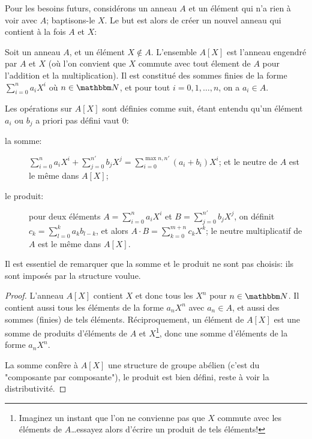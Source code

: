   Pour les besoins futurs, considérons un anneau \( A \) et un élément qui n'a rien à voir avec \( A \); baptisons-le \( X \). Le but est alors de créer un nouvel anneau qui contient à la fois \( A \) et \( X \):

\begin{propositionDef}   \label{DefAnneauPolyAX}
  Soit un anneau \( A \), et un élément \( X \notin A \). L'ensemble \( A[X] \) est l'anneau engendré par \( A \) et \( X \) (où l'on convient que \( X \) commute avec tout élement de \(A \) pour l'addition et la multiplication). Il est constitué des sommes finies de la forme \( \sum_{i = 0}^n a_i X^i \) où \( n \in \eN \), et pour tout \( i = 0, 1, \dots, n \), on a \( a_i \in A \).
  
  Les opérations sur \( A[X] \) sont définies comme suit, étant entendu qu'un élément \(a_i\) ou \(b_j\) a priori pas défini vaut 0:
  \begin{description}
    \item[la somme:] \( \sum_{i = 0}^n a_i X^i + \sum_{j = 0}^{n'} b_j X^j =  \sum_{i = 0}^{\max{n, n'}} (a_i + b_i) X^i \); et le neutre de \( A \) est le même dans \( A[X] \);
    \item[le produit:] pour deux éléments \( A = \sum_{i = 0}^n a_i X^i \) et \(B = \sum_{j = 0}^{n'} b_j X^j \), on définit \( c_k = \sum_{l = 0}^k a_k b_{l-k} \), et alors \( A \cdot B = \sum_{k = 0}^{m+n} c_k X^k \); le neutre multiplicatif de \( A \) est le même dans \( A[X] \).
  \end{description}
\end{propositionDef}

Il est essentiel de remarquer que la somme et le produit ne sont pas choisis: ils sont imposés par la structure voulue.

\begin{proof}
  L'anneau \( A[X] \) contient \( X \) et donc tous les \( X^n \) pour \( n \in \eN \). Il contient aussi tous les éléments de la forme \( a_n X^n \) avec \( a_n \in A \), et aussi des sommes (finies) de tels éléments. Réciproquement, un élément de \( A[X] \) est une somme de produits d'éléments de \( A \) et \( X \)\footnote{Imaginez un instant que l'on ne convienne pas que \( X \) commute avec les éléments de \( A \)\dots essayez alors d'écrire un produit de tels éléments!}, donc une somme d'éléments de la forme \( a_n X^n \).
  
  La somme confère à \( A[X] \) une structure de groupe abélien (c'est du "composante par composante"), le produit est bien défini, reste à voir la distributivité.
\end{proof}

